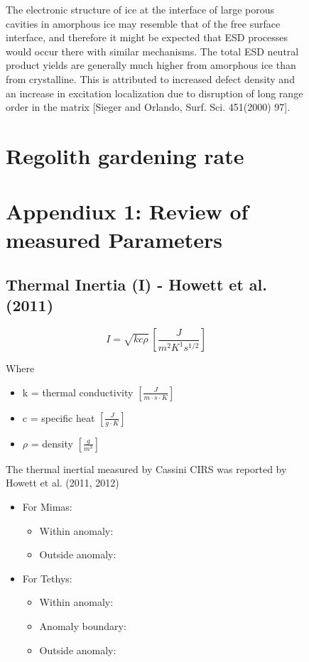 \documentclass[11pt]{article} %
\begin{document}
\begin{figure}[ht]
\begin{Table}
\begin{Comment}
	The electronic structure of ice at the interface of large porous cavities in amorphous ice may resemble that of the free surface interface, and therefore it might be expected that ESD processes would occur there with similar mechanisms. The total ESD neutral product yields are generally much higher from amorphous ice than from crystalline. This is attributed to increased defect density and an increase in excitation localization due to disruption of long range order in the matrix [Sieger and Orlando, Surf. Sci. 451(2000) 97].

\section{Regolith gardening rate}


\newpage

\section{Appendiux 1: Review of measured Parameters}
\label{sec:measured}

\subsection{Thermal Inertia (I) - Howett et al. (2011)}
\label{sec:inertia}

	\begin{equation}
	I = \sqrt{kc\rho} \: [\frac{J}{m^{2} K^{1} s^{1/2}}]
	\end{equation}

	\hspace{1cm}
	Where
	\begin{itemize}[leftmargin=3cm]
	\item k = thermal conductivity $[\frac{J}{m \cdot s \cdot K}]$
	\item c = specific heat $[\frac{J}{g \cdot K}]$
	\item $\rho$ = density $[\frac{g}{m^{3}}]$
	\end{itemize}

	The thermal inertial measured by Cassini CIRS was reported by Howett et al. (2011, 2012)
	\begin{itemize}
		\item For Mimas:
		\begin{itemize}
			\item Within anomaly: 
			\item Outside anomaly: 
		\end{itemize}
		\item For Tethys:
		\begin{itemize}
			\item Within anomaly: 
			\item Anomaly boundary: 
			\item Outside anomaly: 
		\end{itemize}
	\end{itemize}
		

\end{Comment}
\end{Table}
\end{figure}
\end{document}

